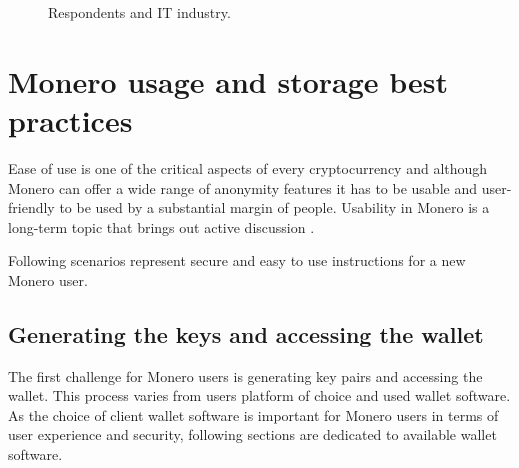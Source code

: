 \documentclass[
  printed, %
  table,   %
  nolof,     %
  nolot,     %
           oneside, color
]{fithesis3}
\begin{document}
\begin{center}
\begin{figure}[H]
\caption{Respondents and IT industry.}
\label{chart:itindustryuserresearch}\end{figure}\end{center}

\chapter{Monero usage and storage best practices}
Ease of use is one of the critical aspects of every cryptocurrency and although Monero can offer a wide range of anonymity features it has to be usable and user-friendly to be used by a substantial margin of people. Usability in Monero is a long-term topic that brings out active discussion \cite{monerolang2018}.

Following scenarios represent secure and easy to use instructions for a new Monero user.

\section{Generating the keys and accessing the wallet}
The first challenge for Monero users is generating key pairs and accessing the wallet. This process varies from users platform of choice and used wallet software. As the choice of client wallet software is important for Monero users in terms of user experience and security, following sections are dedicated to available wallet software. %
\end{document}
